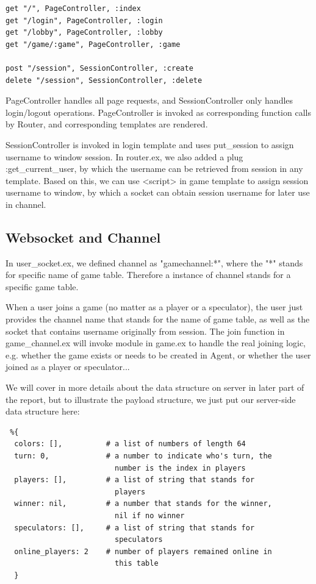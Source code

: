 \begin{lstlisting}
get "/", PageController, :index
get "/login", PageController, :login
get "/lobby", PageController, :lobby
get "/game/:game", PageController, :game

post "/session", SessionController, :create
delete "/session", SessionController, :delete
\end{lstlisting}

PageController handles all page requests, and SessionController only handles 
login/logout operations. PageController is invoked as corresponding function 
calls by Router, and corresponding templates are rendered. 

SessionController is invoked in login template and uses put\_session to assign 
username to window session. In router.ex, we also added a plug :get\_current\_user, 
by which the username can be retrieved from session in any template. Based on 
this, we can use <script> in game template to assign session username to window, 
by which a socket can obtain session username for later use in channel.


\subsection{Websocket and Channel}
In user\_socket.ex, we defined channel as "gamechannel:*", where the "*" stands 
for specific name of game table. Therefore a instance of channel stands for a 
specific game table. 

 When a user joins a game (no matter as a player or a speculator), the user just 
 provides the channel name that stands for the name of game table, as well as 
 the socket that contains username originally from session. The join function 
 in game\_channel.ex will invoke module in game.ex to handle the real joining 
 logic, e.g. whether the game exists or needs to be created in Agent, or 
 whether the user joined as a player or speculator...

 We will cover in more details about the data structure on server in later part 
 of the report, but to illustrate the payload structure, we just put our 
 server-side data structure here:

 \begin{lstlisting}
 %{ 
  colors: [],          # a list of numbers of length 64
  turn: 0,             # a number to indicate who's turn, the 
                         number is the index in players
  players: [],         # a list of string that stands for 
                         players
  winner: nil,         # a number that stands for the winner, 
                         nil if no winner
  speculators: [],     # a list of string that stands for 
                         speculators
  online_players: 2    # number of players remained online in 
                         this table
  }
  \end{lstlisting}

